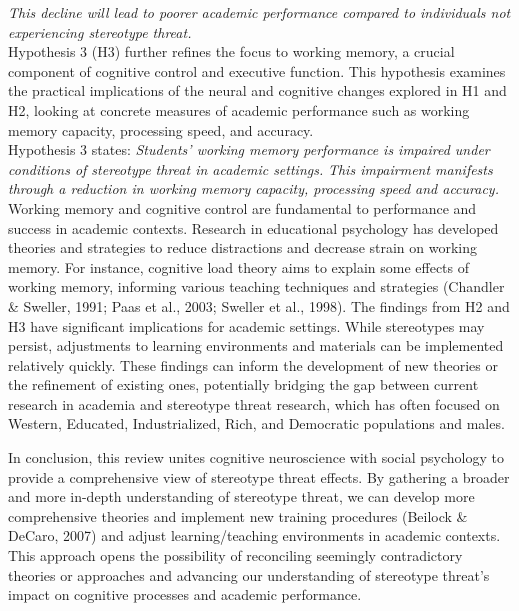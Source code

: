 \documentclass[
  stu, a4paper, 12pt,mask,floatsintext]{apa7}
\begin{document}
\emph{This decline will lead to poorer academic performance compared to individuals not experiencing stereotype threat.}\\
Hypothesis 3 (H3) further refines the focus to working memory, a crucial component of cognitive control and executive function.
This hypothesis examines the practical implications of the neural and cognitive changes explored in H1 and H2, looking at concrete measures of academic performance such as working memory capacity, processing speed, and accuracy.\\
Hypothesis 3 states: \emph{Students' working memory performance is impaired under conditions of stereotype threat in academic settings.}
\emph{This impairment manifests through a reduction in working memory capacity, processing speed and accuracy.}\\
Working memory and cognitive control are fundamental to performance and success in academic contexts. Research in educational psychology has developed theories and strategies to reduce distractions and decrease strain on working memory.
For instance, cognitive load theory aims to explain some effects of working memory, informing various teaching techniques and strategies (Chandler \& Sweller, 1991; Paas et al., 2003; Sweller et al., 1998).
The findings from H2 and H3 have significant implications for academic settings.
While stereotypes may persist, adjustments to learning environments and materials can be implemented relatively quickly.
These findings can inform the development of new theories or the refinement of existing ones, potentially bridging the gap between current research in academia and stereotype threat research, which has often focused on Western, Educated, Industrialized, Rich, and Democratic populations and males.

In conclusion, this review unites cognitive neuroscience with social psychology to provide a comprehensive view of stereotype threat effects.
By gathering a broader and more in-depth understanding of stereotype threat, we can develop more comprehensive theories and implement new training procedures (Beilock \& DeCaro, 2007) and adjust learning/teaching environments in academic contexts.
This approach opens the possibility of reconciling seemingly contradictory theories or approaches and advancing our understanding of stereotype threat's impact on cognitive processes and academic performance.
\end{document}
